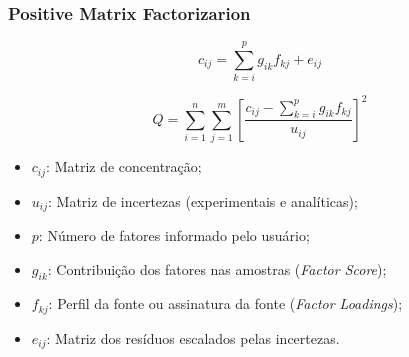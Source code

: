 \begin{frame}
	\frametitle{Positive Matrix Factorizarion}
\begin{equation*}
c_{ij} = \sum_{k=i}^p g_{ik}f_{kj} + e_{ij}
\label{eq:pmf}
\end{equation*}

\begin{equation*}
Q = \sum_{i=1}^n \sum_{j=1}^m  \left[ \frac{c_{ij} - \sum_{k=i}^p g_{ik}f_{kj}} {u_{ij}} \right] ^2
\label{eq:pmfobjectfull}
\end{equation*}

\begin{itemize}
		\item $c_{ij}$: Matriz de concentração;
		\item $u_{ij}$: Matriz de incertezas (experimentais e analíticas);
		\item $p$: Número de fatores informado pelo usuário;
		\item $g_{ik}$: Contribuição dos fatores nas amostras (\textit{Factor Score});
		\item $f_{kj}$: Perfil da fonte ou assinatura da fonte (\textit{Factor Loadings});
		\item $e_{ij}$: Matriz dos resíduos escalados pelas incertezas.

\end{itemize}
\end{frame}
